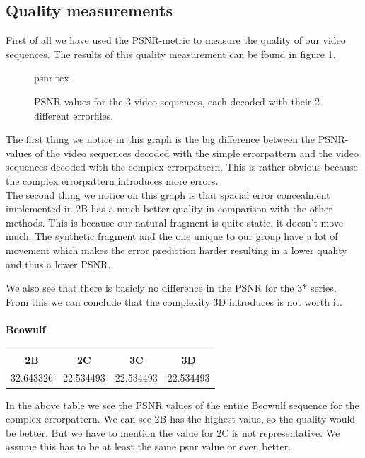 \documentclass[a4paper,11pt,oneside]{article}
\begin{document}
\subsection{Quality measurements}
\vspace{-0.5cm}
First of all we have used the PSNR-metric to measure the quality of our video sequences. The results of this quality measurement can be found in figure \ref{fig:PSNR}.\\
\vspace{-0.7cm}
\begin{figure}[H]
{psnr.tex}
\caption{PSNR values for the 3 video sequences, each decoded with their 2 different errorfiles.}
\label{fig:PSNR}
\end{figure}
\vspace{-0.5cm}
The first thing we notice in this graph is the big difference between the PSNR-values of the video sequences decoded with the simple errorpattern and the video sequences decoded with the complex errorpattern. This is rather obvious because the complex errorpattern introduces more errors.\\
The second thing we notice on this graph is that spacial error concealment implemented in 2B has a much better quality in comparison with the other methods. This is because our natural fragment is quite static, it doesn't move much. The synthetic fragment and the one unique to our group have a lot of movement which makes the error prediction harder resulting in a lower quality and thus a lower PSNR.

We also see that there is basicly no difference in the PSNR for the 3* series. From this we can conclude that the complexity 3D introduces is not worth it.

\paragraph{Beowulf}
\begin{center}
\vspace{-1cm}
\begin{tabular}{c|c|c|c}
2B&2C&3C&3D\\
\hline
32.643326&22.534493&22.534493&22.534493
\end{tabular}
\end{center}
\vspace{-0.5cm}
In the above table we see the PSNR values of the entire Beowulf sequence for the complex errorpattern. We can see 2B has the highest value, so the quality would be better. But we have to mention the value for 2C is not representative. We assume this has to be at least the same psnr value or even better.
\end{document}
